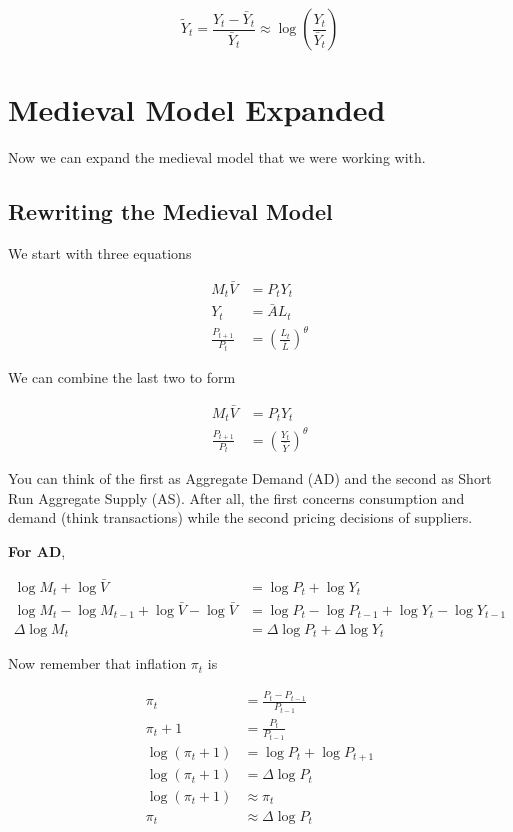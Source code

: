 \documentclass[11pt]{scrartcl}
\begin{document}
\[ \tilde{Y}_t = \frac{Y_t - \bar{Y}_t}{\bar{Y}_t} \approx \log{\left(\frac{Y_t}{\bar{Y}_t}\right)} \]

\section{Medieval Model Expanded}

Now we can expand the medieval model that we were working with.

\subsection{Rewriting the Medieval Model}

We start with three equations

\begin{align*}
M_t \bar{V} &= P_t Y_t \\
Y_t &= \bar{A} L_t \\
\frac{P_{t+1}}{P_{t}} &= \left(\frac{L_t}{\bar{L}}\right)^\theta
\end{align*}

We can combine the last two to form

\begin{align*}
M_t \bar{V} &= P_t Y_t \\
\frac{P_{t+1}}{P_{t}} &= \left(\frac{Y_t}{\bar{Y}}\right)^\theta
\end{align*}

You can think of the first as Aggregate Demand (AD) and the second as Short Run Aggregate Supply (AS). After all, the first concerns consumption and demand (think transactions) while the second pricing decisions of suppliers.

\textbf{For AD},

\begin{align*}
\log{M_t} + \log{\bar{V}} &= \log{P_t} + \log{Y_t} \\
\log{M_t} - \log{M_{t-1}} + \log{\bar{V}} - \log{\bar{V}} &= \log{P_t} - \log{P_{t-1}}+ \log{Y_t} - \log{Y_{t-1}} \\
\Delta \log{M_t} &= \Delta \log{P_t} + \Delta \log{Y_t}
\end{align*}

Now remember that inflation $\pi_t$ is

\begin{align*}
\pi_t &= \frac{P_t - P_{t-1}}{P_{t-1}} \\
\pi_t + 1 &= \frac{P_t}{P_{t-1}} \\
\log{(\pi_t + 1)} &= \log{P_t} + \log{P_{t+1}} \\
\log{(\pi_t + 1)} &= \Delta \log{P_t} \\
\log{(\pi_t + 1)} &\approx \pi_t \\
\pi_t &\approx \Delta \log{P_t}
\end{align*}
\end{document}
